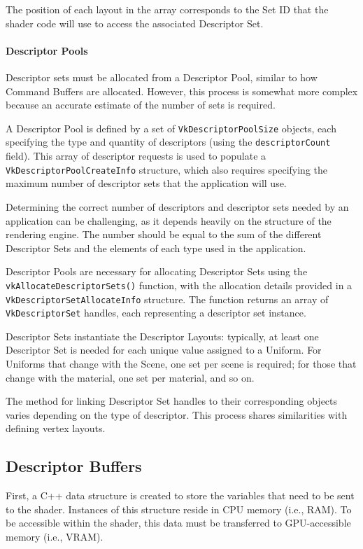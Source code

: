 The position of each layout in the array corresponds to the Set ID that the shader code will use to access the associated Descriptor Set.


\paragraph*{Descriptor Pools}
Descriptor sets must be allocated from a Descriptor Pool, similar to how Command Buffers are allocated. 
However, this process is somewhat more complex because an accurate estimate of the number of sets is required.

A Descriptor Pool is defined by a set of \texttt{VkDescriptorPoolSize} objects, each specifying the type and quantity of descriptors (using the \texttt{descriptorCount} field). 
This array of descriptor requests is used to populate a \texttt{VkDescriptorPoolCreateInfo} structure, which also requires specifying the maximum number of descriptor sets that the application will use.

Determining the correct number of descriptors and descriptor sets needed by an application can be challenging, as it depends heavily on the structure of the rendering engine. 
The number should be equal to the sum of the different Descriptor Sets and the elements of each type used in the application.

Descriptor Pools are necessary for allocating Descriptor Sets using the \\\texttt{vkAllocateDescriptorSets()} function, with the allocation details provided in a \\\texttt{VkDescriptorSetAllocateInfo} structure. 
The function returns an array of \texttt{VkDescriptorSet} handles, each representing a descriptor set instance.

Descriptor Sets instantiate the Descriptor Layouts: typically, at least one Descriptor Set is needed for each unique value assigned to a Uniform. 
For Uniforms that change with the Scene, one set per scene is required; for those that change with the material, one set per material, and so on.

The method for linking Descriptor Set handles to their corresponding objects varies depending on the type of descriptor. 
This process shares similarities with defining vertex layouts.

\subsection{Descriptor Buffers}
First, a C++ data structure is created to store the variables that need to be sent to the shader. Instances of this structure reside in CPU memory (i.e., RAM). 
To be accessible within the shader, this data must be transferred to GPU-accessible memory (i.e., VRAM).

